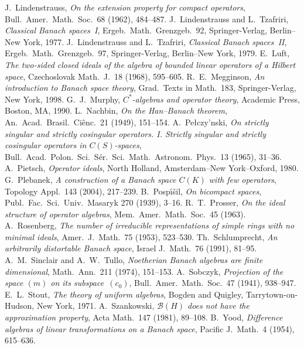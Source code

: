 \documentclass[12pt]{amsart}
\theoremstyle{definition}
\numberwithin{equation}{section}
\begin{document}
\begin{thebibliography}{99}
 J.~Lindenstrauss, \emph{On the extension property for
    compact operators}, {Bull.\ Amer.\ Math.\ Soc.}~{68} (1962),
  484--487.
 J.~Lindenstrauss and L.~Tzafriri, \emph{Classical Banach
  spaces~I}, Ergeb.\ Math.\ Grenz\-geb.~{92}, Springer-Verlag,
  Berlin--New York, 1977.
 J.~Lindenstrauss and L.~Tzafriri, \emph{Classical Banach
  spaces~II}, Ergeb.\ Math.\ Grenz\-geb.~{97}, Springer-Verlag,
  Berlin--New York, 1979.
 E.~Luft, \emph{The two-sided closed ideals of the algebra of
  bounded linear operators of a Hilbert space}, {Czechoslovak 
    Math.~J.}~{18} (1968), 595--605. 
 R.~E.~Megginson, \emph{An introduction to Banach
    space theory}, Grad.\ Texts in Math.~{183}, Springer-Verlag,
  New York, 1998.
 G.~J.~Murphy, \emph{$C^*$-algebras and operator
    theory}, Academic Press, Boston, MA, 1990. 
 L.~Nachbin, \emph{On the Han--Banach theorem},
  {An.\ Acad.\ Brasil.\ Ci\^{e}nc.}~{21} (1949), 151--154.
 A.~Pe{\l}czy{\a'n}ski, \emph{On strictly singular and strictly
  cosingular operators. I. Strictly singular and strictly cosingular
  operators in $C(S)$-spaces}, {Bull.\ Acad.\ Polon.\ Sci.\
    S\'{e}r.\ Sci.\ Math.\ Astronom.\ Phys.}~{13} (1965),
  31--36.
 A.~Pietsch, \emph{Operator ideals}, North Holland,
  Amsterdam--New York--Oxford, 1980.
 G.~Plebanek, \emph{A construction of a Banach space
    $C(K)$ with few operators}, {Topology Appl.}~{143} (2004),
  217--239.
 B.~Posp\'{\i}\v{s}il, \emph{On bicompact spaces},
  {Publ.\ Fac.\ Sci.\ Univ.\ Masaryk} {270} (1939), 3--16.
 R.~T.~Prosser, \emph{On the ideal structure of
    operator algebras}, {Mem.\ Amer.\ Math.\ Soc.}~{45} (1963).
 A.~Rosenberg, \emph{The number of irreducible
  representations of simple rings with no minimal ideals},
  {Amer.\ J.~Math.}~{75} (1953), 523--530.
 Th.\ Schlumprecht, \emph{An arbitrarily distortable
    Banach space}, {Israel J.~Math.}~{76} (1991), 81--95.
 A.~M.~Sinclair and A.~W.~Tullo, \emph{Noetherian Banach
    algebras are finite dimensional}, {Math.\ Ann.}~{211} (1974),
  151--153.
 A.~Sobczyk, \emph{Projection of the space $(m)$ on its
    subspace~$(c_0)$}, {Bull.\ Amer.\ Math.\ Soc.}~{47} (1941),
  938--947.
 E.~L.~Stout, \emph{The theory of uniform algebras},
  Bogden and Quigley, Tarrytown-on-Hudson, New York, 1971.
 A.~Szankowski, \emph{$\mathscr{B}(H)$ does not have the
  approximation property}, {Acta Math.}~{147} (1981),
  89--108.
 B.~Yood, \emph{Difference algebras of linear
transformations on a Banach space}, {Pacific J.~Math.}~{4}
(1954), 615--636.
\end{thebibliography}
\end{document}
